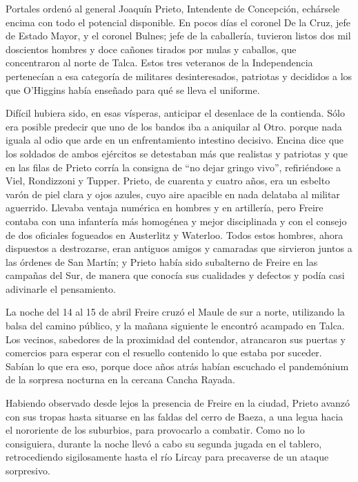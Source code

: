 \documentclass[10pt,twoside,openright]{memoir}
\begin{document}
Portales ordenó al general Joaquín Prieto, Intendente de Concepción,
echársele encima con todo el potencial disponible. En pocos días el
coronel De la Cruz, jefe de Estado Mayor, y el coronel Bulnes; jefe de
la caballería, tuvieron listos dos mil doscientos hombres y doce cañones
tirados por mulas y caballos, que concentraron al norte de Talca. Estos
tres veteranos de la Independencia pertenecían a esa categoría
 de militares desinteresados,
patriotas y decididos a los que O'Higgins había enseñado para qué se
lleva el uniforme.

Difícil hubiera sido, en esas vísperas, anticipar el desenlace de la
contienda. Sólo era posible predecir que uno de los bandos iba a
aniquilar al Otro. porque nada iguala al odio que arde en un
enfrentamiento intestino decisivo. Encina dice que los soldados de ambos
ejércitos se detestaban más que realistas y patriotas y que en las filas
de Prieto corría la consigna de ``no dejar gringo vivo'', refiriéndose a
Viel, Rondizzoni y Tupper. Prieto, de cuarenta y cuatro años, era un esbelto 
varón de piel clara y ojos  azules, cuyo aire
apacible en nada delataba al militar aguerrido. Llevaba ventaja numérica
en hombres y en artillería, pero Freire contaba con una infantería
más homogénea y mejor disciplinada y
con el consejo de dos oficiales fogueados en Austerlitz y Waterloo.
Todos estos hombres, ahora dispuestos a destrozarse, eran antiguos
amigos y camaradas que sirvieron juntos a las órdenes de San Martín; y
Prieto había sido subalterno de Freire en las campañas del Sur, de
manera que conocía sus cualidades y defectos y podía casi adivinarle el
pensamiento.

La noche del 14 al 15 de abril Freire cruzó el Maule de sur a norte,
utilizando la balsa del camino público, y la mañana siguiente le
encontró acampado en Talca. Los vecinos, sabedores de la proximidad del
contendor, atrancaron sus puertas y comercios para esperar con el
resuello contenido lo que estaba por suceder. Sabían lo que era eso,
porque doce años atrás habían escuchado el pandemónium de la sorpresa
nocturna en la cercana Cancha Rayada.


Habiendo observado desde lejos la presencia de Freire en la ciudad,
Prieto avanzó con sus tropas hasta situarse en las faldas del cerro de
Baeza, a una legua hacia el nororiente de los suburbios, para provocarlo
a combatir. Como no lo consiguiera, durante la noche llevó a cabo su
segunda jugada en el tablero, retrocediendo sigilosamente hasta el río
Lircay para precaverse de un ataque sorpresivo.
\end{document}

